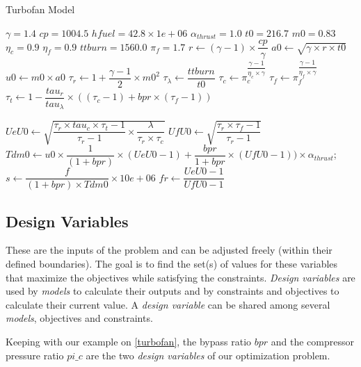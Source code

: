 \begin{algorithm}
\caption{Turbofan Model}
\label{algo_turbofan}

	\;
	$\gamma =1.4$\;
	$cp = 1004.5$\;
	$hfuel = 42.8 \times 1e+06$\;
	$\alpha_{thrust} 	= 1.0$\;
	$t0 		= 216.7$\;
	$m0 		= 0.83$\;
	$\eta_c 		= 0.9$\;
	$\eta_f 		= 0.9$\;
	$ttburn 		= 1560.0$\;
	$\pi_f 		= 1.7$\;
	\;
	$r	\leftarrow (\gamma-1) \times \dfrac{cp}{\gamma}$\;
	$a0	\leftarrow \sqrt{\gamma \times r \times t0}$\;
	$u0	\leftarrow m0 \times a0$\;
	$\tau_r	\leftarrow 1+\dfrac{\gamma-1}{2} \times m0^2$\;
	$\tau_\lambda \leftarrow \dfrac{ttburn}{t0}$\;
	$\tau_c	\leftarrow \pi_c^{\dfrac{\gamma-1}{\eta_c \times \gamma}}$\;
	$\tau_f	\leftarrow \pi_f^{\dfrac{\gamma-1}{\eta_f \times \gamma}}$\;
	$\tau_t	\leftarrow 1-\dfrac{tau_r}{tau_\lambda} \times ((\tau_c-1)+bpr \times (\tau_f-1))$\;

	$UeU0	\leftarrow \sqrt{\dfrac{\tau_r \times tau_c \times \tau_t-1}{\tau_r-1} \times \dfrac{\lambda}{\tau_r \times \tau_c}}$\;
	$UfU0	\leftarrow \sqrt{\dfrac{\tau_r \times \tau_f-1}{\tau_r-1}}$\;
	\;
	$Tdm0	\leftarrow u0 \times \dfrac{1}{(1+bpr)} \times (UeU0-1)+\dfrac{bpr}{1+bpr} \times (UfU0-1)) \times \alpha_{thrust}$;
	$s	\leftarrow \dfrac{f}{(1+bpr) \times Tdm0} \times 10e+06$\;
	$fr	\leftarrow \dfrac{UeU0-1}{UfU0-1}$\;

\end{algorithm}

\subsection{Design Variables}

These are the inputs of the problem and can be adjusted freely (within their defined boundaries). The goal is to find the set(s) of values for these variables that maximize the objectives while satisfying the constraints.
\emph{Design variables} are used by \emph{models} to calculate their outputs and by constraints and objectives to calculate their current value. A \emph{design variable} can be shared among several \emph{models}, objectives and constraints.

Keeping with our example on \figurename{} \ref{turbofan}, the bypass ratio $bpr$ and the compressor pressure ratio $pi\_c$ are the two \emph{design variables} of our optimization problem.

